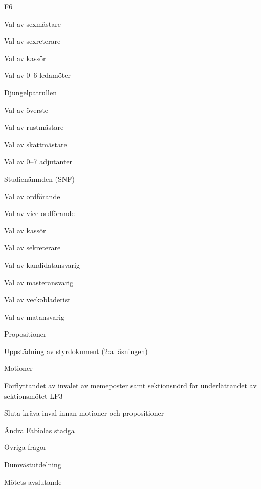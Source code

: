 \documentclass[slutlig]{sektionsmote}
\begin{document}
\begin{ootd}
\begin{ootd}
    \item F6
    \begin{ootd}
        \item Val av sexmästare
        \item Val av sexreterare
        \item Val av kassör
        \item Val av 0--6 ledamöter
    \end{ootd}
    \item Djungelpatrullen
    \begin{ootd}
        \item Val av överste
        \item Val av rustmästare
        \item Val av skattmästare
        \item Val av 0--7 adjutanter
    \end{ootd}
    \item Studienämnden (SNF)
    \begin{ootd}
        \item Val av ordförande
        \item Val av vice ordförande
        \item Val av kassör
        \item Val av sekreterare
        \item Val av kandidatansvarig
        \item Val av masteransvarig
        \item Val av veckobladerist
        \item Val av matansvarig
    \end{ootd}
\end{ootd}

\item{Propositioner}
\begin{ootd}
    \item Uppstädning av styrdokument (2:a läsningen)
\end{ootd}

\item{Motioner}
\begin{ootd}
    \item Förflyttandet av invalet av memeposter samt sektionsnörd för underlättandet av sektionsmötet LP3
    \item Sluta kräva inval innan motioner och propositioner
    \item Ändra Fabiolas stadga
\end{ootd}

\item{Övriga frågor}

\item{Dumvästutdelning}

\item{Mötets avslutande}
\end{ootd}
\end{document}
